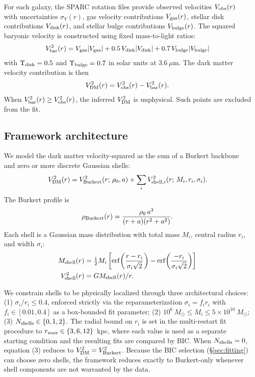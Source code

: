 \documentclass[linenumbers]{aastex701}
\newcommand{\Ydisk}{\Upsilon_{\rm disk}}
\newcommand{\Ybulge}{\Upsilon_{\rm bulge}}
\newcommand{\Vobs}{V_{\rm obs}}
\newcommand{\Vbar}{V_{\rm bar}}
\newcommand{\Vgas}{V_{\rm gas}}
\newcommand{\Vdisk}{V_{\rm disk}}
\newcommand{\Vbulge}{V_{\rm bulge}}
\newcommand{\VDM}{V_{\rm DM}}
\newcommand{\Msun}{M_\odot}
\begin{document}
For each galaxy, the SPARC rotation files provide observed velocities $\Vobs(r)$ with uncertainties $\sigma_V(r)$, gas velocity contributions $\Vgas(r)$, stellar disk contributions $\Vdisk(r)$, and stellar bulge contributions $\Vbulge(r)$. The squared baryonic velocity is constructed using fixed mass-to-light ratios:
\begin{equation}
\Vbar^2(r) = \Vgas|\Vgas| + 0.5\, \Vdisk|\Vdisk| + 0.7\, \Vbulge|\Vbulge|
\end{equation}
with $\Ydisk = 0.5$ and $\Ybulge = 0.7$ in solar units at $3.6~\mu$m. The dark matter velocity contribution is then
\begin{equation}
\VDM^2(r) = \Vobs^2(r) - \Vbar^2(r).
\end{equation}
When $\Vbar^2(r) \ge \Vobs^2(r)$, the inferred $\VDM^2$ is unphysical. Such points are excluded from the fit.

\subsection{Framework architecture}

We model the dark matter velocity-squared as the sum of a Burkert backbone and zero or more discrete Gaussian shells:
\begin{equation}
\VDM^2(r) = V_{\rm Burkert}^2(r;\, \rho_0, a) + \sum_i V_{{\rm shell},i}^2(r;\, M_i, r_i, \sigma_i).
\end{equation}
The Burkert profile is
\begin{equation}
\rho_{\rm Burkert}(r) = \frac{\rho_0\, a^3}{(r + a)(r^2 + a^2)}.
\end{equation}
Each shell is a Gaussian mass distribution with total mass $M_i$, central radius $r_i$, and width $\sigma_i$:
\begin{align}
M_{\rm shell}(r) &= \tfrac{1}{2} M_i \left[ \mathrm{erf}\!\left(\frac{r - r_i}{\sigma_i \sqrt{2}}\right) - \mathrm{erf}\!\left(\frac{-r_i}{\sigma_i \sqrt{2}}\right) \right] \\
V_{\rm shell}^2(r) &= G M_{\rm shell}(r) / r.
\end{align}

We constrain shells to be physically localized through three architectural choices: (1) $\sigma_i / r_i \le 0.4$, enforced strictly via the reparameterization $\sigma_i = f_i r_i$ with $f_i \in [0.01, 0.4]$ as a box-bounded fit parameter; (2) $10^6~\Msun \le M_i \le 5 \times 10^{10}~\Msun$; (3) $N_{\rm shells} \in \{0, 1, 2\}$. The radial bound on $r_i$ is set in the multi-restart fit procedure to $r_{\rm max} \in \{3, 6, 12\}$~kpc, where each value is used as a separate starting condition and the resulting fits are compared by BIC. When $N_{\rm shells} = 0$, equation (3) reduces to $\VDM^2 = V_{\rm Burkert}^2$. Because the BIC selection (\S\ref{sec:fitting}) can choose zero shells, the framework reduces exactly to Burkert-only whenever shell components are not warranted by the data.
\end{document}
